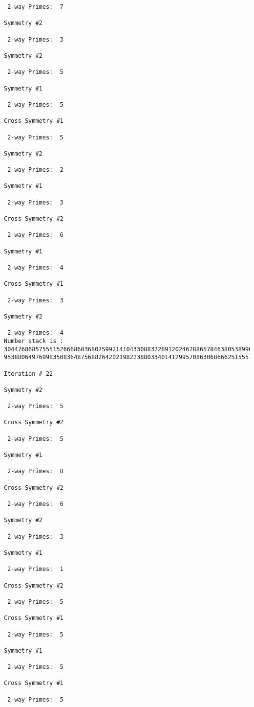 {{{{\begin{verbatim}
 2-way Primes: 	7

Symmetry #2

 2-way Primes: 	3

Symmetry #2

 2-way Primes: 	5

Symmetry #1

 2-way Primes: 	5

Cross Symmetry #1

 2-way Primes: 	5

Symmetry #2

 2-way Primes: 	2

Symmetry #1

 2-way Primes: 	3

Cross Symmetry #2

 2-way Primes: 	6

Symmetry #1

 2-way Primes: 	4

Cross Symmetry #1

 2-way Primes: 	3

Symmetry #2

 2-way Primes: 	4
Number stack is :
30447686857555152666860368075992141043308832289120246288657846380538996794608835958544046240163340857
95388064976998350836487568826420219822388033401412995708630686662515557586867440375804336104264044585

Iteration #	22

Symmetry #2

 2-way Primes: 	5

Cross Symmetry #2

 2-way Primes: 	5

Symmetry #1

 2-way Primes: 	8

Cross Symmetry #2

 2-way Primes: 	6

Symmetry #2

 2-way Primes: 	3

Symmetry #1

 2-way Primes: 	1

Cross Symmetry #2

 2-way Primes: 	5

Cross Symmetry #1

 2-way Primes: 	5

Symmetry #1

 2-way Primes: 	5

Cross Symmetry #1

 2-way Primes: 	5


\end{verbatim}}}}}
